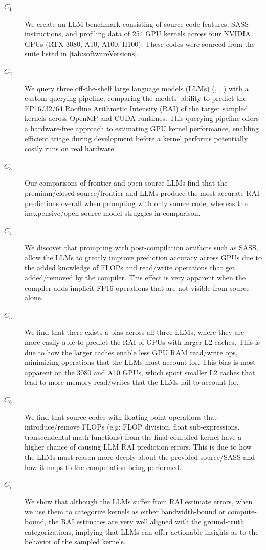 \documentclass[conference]{IEEEtran}
\begin{document}
\begin{description}
\item[$C_1$] We create an LLM benchmark consisting of source code features, SASS instructions, and profiling data of 254 GPU kernels across four NVIDIA GPUs (RTX 3080, A10, A100, H100).
These codes were sourced from the \hecbench suite listed in \autoref{tab:softwareVersions}.
\item[$C_2$] We query three off-the-shelf large language models (LLMs) (\gptoss, \gptfivefour, \opus) with a custom querying pipeline, comparing the models' ability to predict the FP16/32/64 Roofline Arithmetic Intensity (RAI) of the target sampled kernels across OpenMP and CUDA runtimes.
This querying pipeline offers a hardware-free approach to estimating GPU kernel performance, enabling efficient triage during development before a kernel performs potentially costly runs on real hardware.
\item[$C_3$] Our comparisons of frontier and open-source LLMs find that the premium/closed-source/frontier \opus and \gptfivefour LLMs produce the most accurate RAI predictions overall when prompting with only source code, whereas the inexpensive/open-source \gptoss model struggles in comparison.
\item[$C_4$] We discover that prompting with post-compilation artifacts such as SASS, allow the LLMs to greatly improve prediction accuracy across GPUs due to the added knowledge of FLOPs and read/write operations that get added/removed by the compiler.
This effect is very apparent when the compiler adds implicit FP16 operations that are not visible from source alone.
\item[$C_5$] We find that there exists a bias across all three LLMs, where they are more easily able to predict the RAI of GPUs with larger L2 caches.
This is due to how the larger caches enable less GPU RAM read/write ops, minimizing operations that the LLMs must account for.
This bias is most apparent on the 3080 and A10 GPUs, which sport smaller L2 caches that lead to more memory read/writes that the LLMs fail to account for.
\item[$C_6$] We find that source codes with floating-point operations that introduce/remove FLOPs (e.g: FLOP division, float sub-expressions, transcendental math functions) from the final compiled kernel have a higher chance of causing LLM RAI prediction errors.
This is due to how the LLMs must reason more deeply about the provided source/SASS and how it maps to the computation being performed.
\item[$C_7$] We show that although the LLMs suffer from RAI estimate errors, when we use them to categorize kernels as either bandwidth-bound or compute-bound, the RAI estimates are very well aligned with the ground-truth categorizations, implying that LLMs can offer actionable insights as to the behavior of the sampled kernels.

\end{description}
\end{document}
